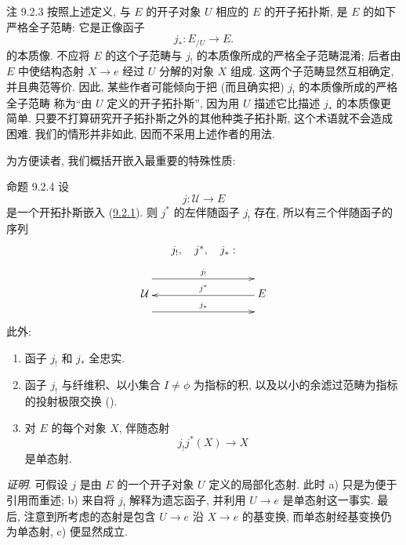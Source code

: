 \begin{enonce*}[remark]{注 9.2.3}
按照上述定义, 与 $E$ 的开子对象 $U$ 相应的 $E$ 的开子拓扑斯,
是 $E$ 的如下严格全子范畴:
它是正像函子
$$
j_{\ast}:E_{/U}\longrightarrow E.
$$
的本质像.
不应将 $E$ 的这个子范畴与 $j_{!}$ 的本质像所成的严格全子范畴混淆;
后者由 $E$ 中使结构态射 $X\rightarrow e$ 经过 $U$ 分解的对象 $X$ 组成.
这两个子范畴显然互相确定, 并且典范等价.
因此, 某些作者可能倾向于把
(而且确实把) $j_{!}$ 的本质像所成的严格全子范畴
称为“由 $U$ 定义的开子拓扑斯”,
因为用 $U$ 描述它比描述 $j_{\ast}$ 的本质像\pageoriginale 更简单.
只要不打算研究开子拓扑斯之外的其他种类子拓扑斯,
这个术语就不会造成困难.
我们的情形并非如此, 因而不采用上述作者的用法.

为方便读者, 我们概括开嵌入最重要的特殊性质:
\end{enonce*}

\begin{enonce*}{命题 9.2.4}
设
$$
j:\mathcal{U}\longrightarrow E
$$
是一个开拓扑斯嵌入 (\hyperref[IV.subsubsec9.2.1]{9.2.1}).
则 $j^{\ast}$ 的左伴随函子 $j_{!}$ 存在,
所以有三个伴随函子的序列
\[
\xymatrix@R=.35cm@C=.5cm{
           & j_!,\quad j^{\ast}, \quad j_{\ast} : &\\
&&\\
\mathcal{U} \ar @<-16pt>[rr]^{j_{\ast}} \ar
           @<14pt>[rr]^{j_{!}}&            &\ar @<1pt>[ll]_{j^{\ast}} E
}
\]

此外:
\begin{enumerate}
\renewcommand{\theenumi}{\alph{enumi}}
\renewcommand{\labelenumi}{\theenumi)}
\item 函子 $j_{!}$ 和 $j_{\ast}$ 全忠实.

\item 函子 $j_{!}$ 与纤维积、以小集合 $I\neq\phi$ 为指标的积,
以及以小的余滤过范畴为指标的投射极限交换
().

\item 对 $E$ 的每个对象 $X$, 伴随态射
$$
j_{!}j^{\ast}(X)\longrightarrow X
$$
是单态射.
\end{enumerate}
\end{enonce*}

\noindent \emph{证明}.
可假设 $j$ 是由 $E$ 的一个开子对象 $U$ 定义的局部化态射.
此时 a) 只是为便于引用而重述;
b) 来自将 $j_{!}$ 解释为遗忘函子,
并利用 $U\rightarrow e$ 是单态射这一事实.
最后, 注意到所考虑的态射是包含 $U\rightarrow e$
沿 $X\rightarrow e$ 的基变换,
而单态射经基变换仍为单态射, c) 便显然成立.

